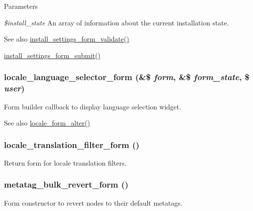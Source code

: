 \begin{DoxyParams}{Parameters}
\item[{\em \$install\_\-state}]An array of information about the current installation state.\end{DoxyParams}
\begin{DoxySeeAlso}{See also}
\hyperlink{install_8core_8inc_a81a30e13b22aa1ad8b0fa4b8f2f07c82}{install\_\-settings\_\-form\_\-validate()} 

\hyperlink{install_8core_8inc_abe061599cf0c6252388fc93366ebae27}{install\_\-settings\_\-form\_\-submit()} 
\end{DoxySeeAlso}
\hypertarget{group__forms_gaa40610c0086c0fadbca6db8b42d83236}{
\subsubsection[{locale\_\-language\_\-selector\_\-form}]{\setlength{\rightskip}{0pt plus 5cm}locale\_\-language\_\-selector\_\-form (\&\$ {\em form}, \/  \&\$ {\em form\_\-state}, \/  \$ {\em user})}}
\label{group__forms_gaa40610c0086c0fadbca6db8b42d83236}
Form builder callback to display language selection widget.

\begin{DoxySeeAlso}{See also}
\hyperlink{locale_8module_a06e23e3ad26b4c81e48ecc15f538dd81}{locale\_\-form\_\-alter()} 
\end{DoxySeeAlso}
\hypertarget{group__forms_gac2e3730d5cd788d059298b3ada8f5a9b}{
\subsubsection[{locale\_\-translation\_\-filter\_\-form}]{\setlength{\rightskip}{0pt plus 5cm}locale\_\-translation\_\-filter\_\-form ()}}
\label{group__forms_gac2e3730d5cd788d059298b3ada8f5a9b}
Return form for locale translation filters. \hypertarget{group__forms_ga73f02a09e1068de6e28ae97baa10a041}{
\subsubsection[{metatag\_\-bulk\_\-revert\_\-form}]{\setlength{\rightskip}{0pt plus 5cm}metatag\_\-bulk\_\-revert\_\-form ()}}
\label{group__forms_ga73f02a09e1068de6e28ae97baa10a041}
Form constructor to revert nodes to their default metatags.

